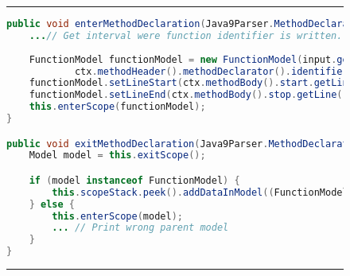 \begin{figure}[H]
\noindent\rule{\textwidth}{1pt}
\begin{lstlisting}[language=Java, caption={Antlr Java listener example}, label={lst:antlrJavaListenerExample}]
public void enterMethodDeclaration(Java9Parser.MethodDeclarationContext ctx) {
	...// Get interval were function identifier is written.
	
	FunctionModel functionModel = new FunctionModel(input.getText(interval),
			ctx.methodHeader().methodDeclarator().identifier().getText());
    functionModel.setLineStart(ctx.methodBody().start.getLine());
	functionModel.setLineEnd(ctx.methodBody().stop.getLine());
	this.enterScope(functionModel);
}

public void exitMethodDeclaration(Java9Parser.MethodDeclarationContext ctx) {
	Model model = this.exitScope();

	if (model instanceof FunctionModel) {
		this.scopeStack.peek().addDataInModel((FunctionModel) model);
	} else {
		this.enterScope(model);
		... // Print wrong parent model
	}
}
\end{lstlisting}
\noindent\rule{\textwidth}{1pt}
\end{figure}